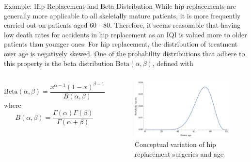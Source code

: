 \documentclass[8pt, hyperref={colorlinks=true}]{beamer}
\begin{document}
\begin{frame}{Example: Hip-Replacement and Beta Distribution}
While hip replacements are generally more applicable to all skeletally mature patients, it is more frequently carried out on patients aged 60 - 80. Therefore, it seems reasonable that having low death rates for accidents in hip replacement as an IQI is valued more to older patients than younger ones. For hip replacement, the distribution of treatment over age is negatively skewed. One of the probability distributions that adhere to this property is the beta distribution $\mathrm{Beta}(\alpha,\beta)$, defined with

\begin{columns}

\begin{definition}
\[
\text{Beta}(\alpha,\beta)=\frac{x^{\alpha-1}(1-x)^{\beta-1}}{B(\alpha,\beta)}
\]
where
\[
B(\alpha,\beta) = \frac{\Gamma(\alpha)\Gamma(\beta)}{\Gamma(\alpha + \beta)}
\]
\end{definition}

\begin{example}
\begin{figure}
    \centering
    \includegraphics[scale=0.3]{hip_replacement.pdf}
    \caption{Conceptual variation of hip replacement surgeries and age}
    \label{fig:hip_replacement}
\end{figure}
\end{example}
\end{columns}
\end{frame}

\end{document}

